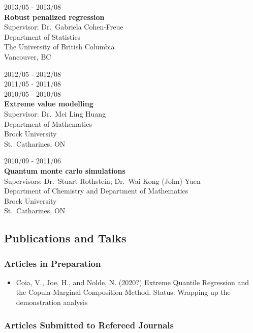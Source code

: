 \documentclass[]{article}
\providecommand{\tightlist}{%
  \setlength{\itemsep}{0pt}\setlength{\parskip}{0pt}}
\begin{document}
2013/05 - 2013/08\\
\textbf{Robust penalized regression}\\
Supervisor: Dr.~Gabriela Cohen-Freue\\
Department of Statistics\\
The University of British Columbia\\
Vancouver, BC

2012/05 - 2012/08\\
2011/05 - 2011/08\\
2010/05 - 2010/08\\
\textbf{Extreme value modelling}\\
Supervisor: Dr.~Mei Ling Huang\\
Department of Mathematics\\
Brock University\\
St.~Catharines, ON

2010/09 - 2011/06\\
\textbf{Quantum monte carlo simulations}\\
Supervisors: Dr.~Stuart Rothstein; Dr.~Wai Kong (John) Yuen\\
Department of Chemistry and Department of Mathematics\\
Brock University\\
St.~Catharines, ON

\hypertarget{publications-and-talks}{%
\subsection{Publications and Talks}\label{publications-and-talks}}

\hypertarget{articles-in-preparation}{%
\subsubsection{Articles in Preparation}\label{articles-in-preparation}}

\begin{itemize}
\tightlist
\item
  Coia, V., Joe, H., and Nolde, N. (2020?) Extreme Quantile Regression and the Copula-Marginal Composition Method.
  Status: Wrapping up the demonstration analysis
\end{itemize}

\hypertarget{articles-submitted-to-refereed-journals}{%
\subsubsection{Articles Submitted to Refereed Journals}\label{articles-submitted-to-refereed-journals}}
\end{document}
